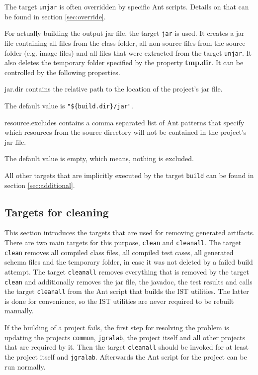 \documentclass[a4paper,twoside,11pt,bibtotoc]{article}
\begin{document}
The target \texttt{unjar} is often overridden by specific Ant scripts.
Details on that can be found in section \ref{sec:override}.

For actually building the output jar file, the target \texttt{jar} is used.
It creates a jar file containing all files from the class folder, all non-source files from the source folder (e.g. image files) and all files that were extracted from the target \texttt{unjar}.
It also deletes the temporary folder specified by the property \textbf{tmp.dir}.
It can be controlled by the following properties.

\begin{description*}
	\item[jar.dir] contains the relative path to the location of the project's jar file.\par The default value is \texttt{"\$\{build.dir\}/jar"}.
	\item[resource.excludes] contains a comma separated list of Ant patterns that specify which resources from the source directory will not be contained in the project's jar file.\par The default value is empty, which means, nothing is excluded.
\end{description*}

All other targets that are implicitly executed by the target \texttt{build} can be found in section \ref{sec:additional}.

\subsection{Targets for cleaning}
\label{sec:cleaning}
This section introduces the targets that are used for removing generated artifacts.
There are two main targets for this purpose, \texttt{clean} and \texttt{cleanall}.
The target \texttt{clean} removes all compiled class files, all compiled test cases, all generated schema files and the temporary folder, in case it was not deleted by a failed build attempt.
The target \texttt{cleanall} removes everything that is removed by the target \texttt{clean} and additionally removes the jar file, the javadoc, the test results and calls the target \texttt{cleanall} from the Ant script that builds the IST utilities.
The latter is done for convenience, so the IST utilities are never required to be rebuilt manually.

If the building of a project fails, the first step for resolving the problem is updating the projects \texttt{common}, \texttt{jgralab}, the project itself and all other projects that are required by it.
Then the target \texttt{cleanall} should be invoked for at least the project itself and \texttt{jgralab}.
Afterwards the Ant script for the project can be run normally.
\end{document}
